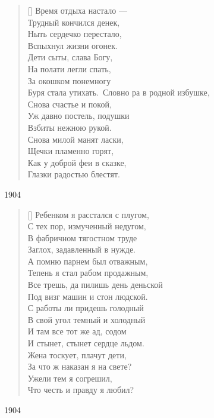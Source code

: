 \poemtitle{}
\settowidth{\versewidth}{Время отдыха настало}
\begin{verse}[\versewidth]
Время отдыха настало ---\\
Трудный кончился денек,\\
Ныть сердечко перестало,\\
Вспыхнул жизни огонек.\\
Дети сыты, слава Богу,\\
На полати легли спать,\\
За окошком понемногу\\
Буря стала утихать.\
Словно ра в родной избушке,\\
Снова счастье и покой,\\
Уж давно постель, подушки\\
Взбиты нежною рукой.\\
Снова милой манят ласки,\\
Щечки пламенно горят,\\
Как у доброй феи в сказке,\\
Глазки радостью блестят.
\end{verse}
1904

\settowidth{\versewidth}{С тех пор измученный недугом}
\begin{verse}[\versewidth]
Ребенком я расстался с плугом,\\
С тех пор, измученный недугом,\\
В фабричном тягостном труде\\
Заглох, задавленный в нужде.\\
А помню парнем был отважным,\\
Тепень я стал рабом продажным,\\
Все трешь, да пилишь день деньской\\
Под визг машин и стон людской.\\
С работы ли придешь голодный\\
В свой угол темный и холодный\\
И там все тот же ад, содом\\
И стынет, стынет сердце льдом.\\
Жена тоскует, плачут дети,\\
За что ж наказан я на свете?\\
Ужели тем я согрешил,\\
Что честь и правду я любил?
\end{verse}
1904

